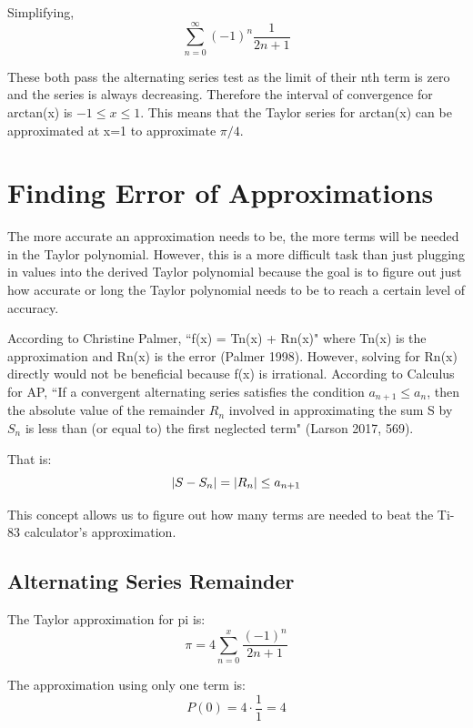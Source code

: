 \documentclass[12pt, titlepage]{article}
\begin{document}
Simplifying,
\begin{equation}
    \sum_{n=0}^{\infty} (-1)^{n} \frac{1}{2n+1}
\end{equation}

These both pass the alternating series test as the limit of their nth term is zero and the series is always decreasing. Therefore the interval of convergence for arctan(x) is \( -1 \leq x \leq 1 \). This means that the Taylor series for arctan(x) can be approximated at x=1 to approximate \(\pi/4\).

\section{Finding Error of Approximations}
The more accurate an approximation needs to be, the more terms will be needed in the Taylor polynomial. However, this is a more difficult task than just plugging in values into the derived Taylor polynomial because the goal is to figure out just how accurate or long the Taylor polynomial needs to be to reach a certain level of accuracy.

According to Christine Palmer, ``f(x) = Tn(x) + Rn(x)" where Tn(x) is the approximation and Rn(x) is the error (Palmer 1998). However, solving for Rn(x) directly would not be beneficial because f(x) is irrational.
According to Calculus for AP, ``If a convergent alternating series satisfies the condition \(a_{n+1} \leq a_{n} \), then the absolute value of the remainder \(R_{n}\) involved in approximating the sum S by \(S_{n}\) is less than (or equal to) the first neglected term" (Larson 2017, 569).

That is:
\begin{equation}
  \abs{S - S_{n}} = \abs{R_{n}} \leq a_{n + 1}
\end{equation}

This concept allows us to figure out how many terms are needed to beat the Ti-83 calculator's approximation.

\subsection{Alternating Series Remainder}
The Taylor approximation for pi is:
\begin{equation}
  \pi = 4\sum_{n=0}^{x}{ \frac{(-1)^n}{2n+1}}
\end{equation}

The approximation using only one term is:
\begin{equation}
  P(0) = 4 \cdot \frac{1}{1} = 4
\end{equation}
\end{document}
